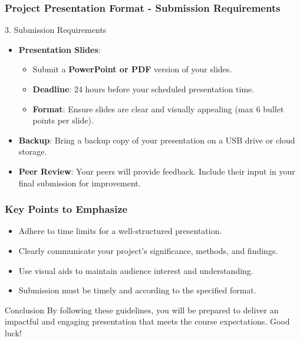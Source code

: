 \documentclass[aspectratio=169]{beamer}
\begin{document}
\begin{frame}[fragile]
    \frametitle{Project Presentation Format - Submission Requirements}
    \begin{block}{3. Submission Requirements}
        \begin{itemize}
            \item \textbf{Presentation Slides}:
                \begin{itemize}
                    \item Submit a \textbf{PowerPoint or PDF} version of your slides.
                    \item \textbf{Deadline}: 24 hours before your scheduled presentation time.
                    \item \textbf{Format}: Ensure slides are clear and visually appealing (max 6 bullet points per slide).
                \end{itemize}
            \item \textbf{Backup}: Bring a backup copy of your presentation on a USB drive or cloud storage.
            \item \textbf{Peer Review}: Your peers will provide feedback. Include their input in your final submission for improvement.
        \end{itemize}
    \end{block}
\end{frame}

\begin{frame}[fragile]
    \frametitle{Key Points to Emphasize}
    \begin{itemize}
        \item Adhere to time limits for a well-structured presentation.
        \item Clearly communicate your project's significance, methods, and findings.
        \item Use visual aids to maintain audience interest and understanding.
        \item Submission must be timely and according to the specified format.
    \end{itemize}
    \begin{block}{Conclusion}
        By following these guidelines, you will be prepared to deliver an impactful and engaging presentation that meets the course expectations. Good luck!
    \end{block}
\end{frame}
\end{document}
